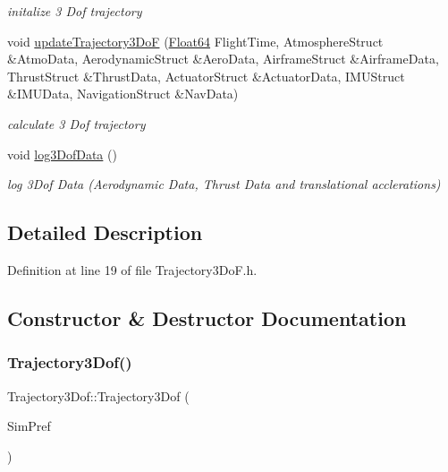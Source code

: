 \begin{DoxyCompactItemize}
\begin{DoxyCompactList}\small\item\em initalize 3 Dof trajectory \end{DoxyCompactList}\item 
void \hyperlink{class_trajectory3_dof_ad3bc8f72bdd7ceed04732de4f0a80926}{update\+Trajectory3\+DoF} (\hyperlink{group___tools_ga3f1431cb9f76da10f59246d1d743dc2c}{Float64} Flight\+Time, Atmosphere\+Struct \&Atmo\+Data, Aerodynamic\+Struct \&Aero\+Data, Airframe\+Struct \&Airframe\+Data, Thrust\+Struct \&Thrust\+Data, Actuator\+Struct \&Actuator\+Data, I\+M\+U\+Struct \&I\+M\+U\+Data, Navigation\+Struct \&Nav\+Data)
\begin{DoxyCompactList}\small\item\em calculate 3 Dof trajectory \end{DoxyCompactList}\item 
void \hyperlink{class_trajectory3_dof_a0ec1ae76ec1d60f03aaef9107b749cd0}{log3\+Dof\+Data} ()
\begin{DoxyCompactList}\small\item\em log 3\+Dof Data (Aerodynamic Data, Thrust Data and translational acclerations) \end{DoxyCompactList}\end{DoxyCompactItemize}


\subsection{Detailed Description}


Definition at line 19 of file Trajectory3\+Do\+F.\+h.



\subsection{Constructor \& Destructor Documentation}
\mbox{\label{class_trajectory3_dof_a884cf7d2bb8442fb86584385ee35f679}} 
\subsubsection{\texorpdfstring{Trajectory3\+Dof()}{Trajectory3Dof()}}
{\footnotesize\ttfamily Trajectory3\+Dof\+::\+Trajectory3\+Dof (\begin{DoxyParamCaption}\item[{Sim\+D\+Preference \&}]{Sim\+Pref }\end{DoxyParamCaption})}



